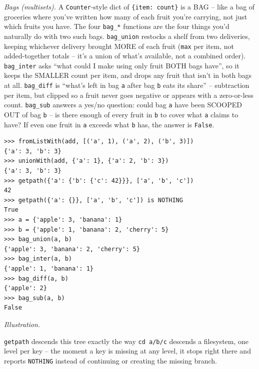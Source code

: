 \documentclass[10pt,letterpaper]{book}
\begin{document}
\textit{Bags (multisets).} A \texttt{Counter}-style dict of \texttt{\{item: count\}} is a BAG -- like
a bag of groceries where you've written how many of each fruit you're carrying, not just which fruits
you have. The four \texttt{bag\_*} functions are the four things you'd naturally do with two such
bags. \texttt{bag\_union} restocks a shelf from two deliveries, keeping whichever delivery brought
MORE of each fruit (\texttt{max} per item, not added-together totals -- it's a union of what's
available, not a combined order). \texttt{bag\_inter} asks ``what could I make using only fruit BOTH
bags have'', so it keeps the SMALLER count per item, and drops any fruit that isn't in both bags at
all. \texttt{bag\_diff} is ``what's left in bag \texttt{a} after bag \texttt{b} eats its share'' --
subtraction per item, but clipped so a fruit never goes negative or appears with a zero-or-less
count. \texttt{bag\_sub} answers a yes/no question: could bag \texttt{a} have been SCOOPED OUT of
bag \texttt{b} -- is there enough of every fruit in \texttt{b} to cover what \texttt{a} claims to
have? If even one fruit in \texttt{a} exceeds what \texttt{b} has, the answer is \texttt{False}.
\begin{lstlisting}[style=ex]
>>> fromListWith(add, [('a', 1), ('a', 2), ('b', 3)])
{'a': 3, 'b': 3}
>>> unionWith(add, {'a': 1}, {'a': 2, 'b': 3})
{'a': 3, 'b': 3}
>>> getpath({'a': {'b': {'c': 42}}}, ['a', 'b', 'c'])
42
>>> getpath({'a': {}}, ['a', 'b', 'c']) is NOTHING
True
>>> a = {'apple': 3, 'banana': 1}
>>> b = {'apple': 1, 'banana': 2, 'cherry': 5}
>>> bag_union(a, b)
{'apple': 3, 'banana': 2, 'cherry': 5}
>>> bag_inter(a, b)
{'apple': 1, 'banana': 1}
>>> bag_diff(a, b)
{'apple': 2}
>>> bag_sub(a, b)
False
\end{lstlisting}
\noindent\textit{Illustration.}
\begin{center}
\end{center}
\texttt{getpath} descends this tree exactly the way \texttt{cd a/b/c} descends a filesystem, one
level per key -- the moment a key is missing at any level, it stops right there and reports
\texttt{NOTHING} instead of continuing or creating the missing branch.
\end{document}
